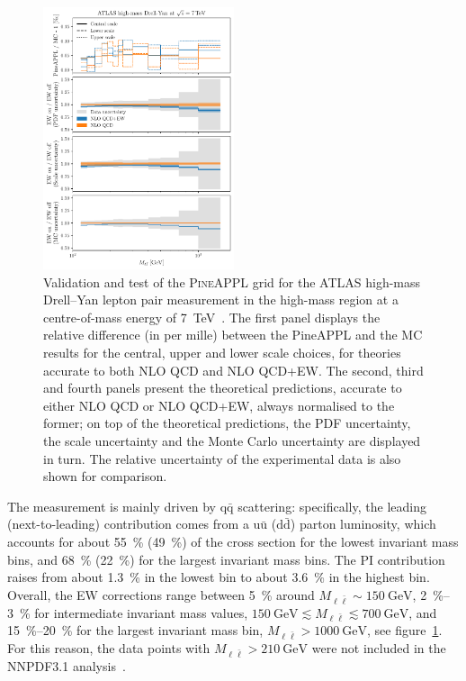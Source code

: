 \begin{figure}[!t]
    \centering
    \includegraphics[width=0.5\textwidth]{figures/pineappl_ATLASZHIGHMASS49FB}
    \caption{Validation and test of the \textsc{PineAPPL} grid for the ATLAS
      high-mass Drell--Yan lepton pair measurement in the high-mass region at
      a centre-of-mass energy of \SI{7}{\tera\electronvolt}~\cite{Aad:2013iua}. The first panel
      displays the relative difference (in per mille) between the {\sc PineAPPL}
      and the MC results for the central, upper and lower scale choices,
      for theories accurate to both NLO QCD and NLO QCD+EW. The second, third
      and fourth panels present the theoretical predictions, accurate to either
      NLO QCD or NLO QCD+EW, always normalised to the former; on top of the
      theoretical predictions, the PDF uncertainty, the scale uncertainty and
      the Monte Carlo uncertainty are displayed in turn. The relative
      uncertainty of the experimental data is also shown for comparison.}
    \label{fig:atlaszhighmass49fb}
\end{figure}

The measurement is mainly driven by $\mathrm{q}\bar{\mathrm{q}}$ scattering: specifically, the
leading (next-to-leading) contribution comes from a $\mathrm{u}\bar{\mathrm{u}}$ ($\mathrm{d}\bar{\mathrm{d}}$)
parton luminosity, which accounts for about \SI{55}{\percent} (\SI{49}{\percent}) of the cross section
for the lowest invariant mass bins, and \SI{68}{\percent} (\SI{22}{\percent}) for the largest invariant
mass bins. The PI contribution raises from about \SI{1.3}{\percent} in the lowest bin to
about \SI{3.6}{\percent} in the highest bin. Overall, the EW corrections range between \SI{5}{\percent}
around $M_{\ell\bar\ell}\sim \SI{150}{\giga\electronvolt}$, \SIrange{2}{3}{\percent} for intermediate invariant mass
values, $\SI{150}{\giga\electronvolt}\lesssim M_{\ell\bar\ell}\lesssim \SI{700}{\giga\electronvolt}$, and
\SIrange{15}{20}{\percent} for the largest invariant mass bin, $M_{\ell\bar\ell}>\SI{1000}{\giga\electronvolt}$,
see figure~\ref{fig:atlaszhighmass49fb}. For this reason, the data points with
$M_{\ell\bar\ell}>\SI{210}{\giga\electronvolt}$ were not included in the NNPDF3.1
analysis~\cite{Ball:2017nwa}.

